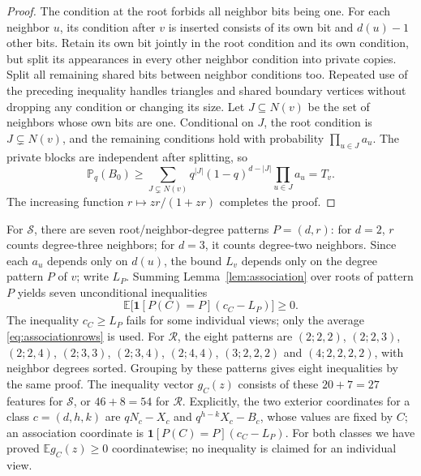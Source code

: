 \documentclass[11pt]{article}
\newcommand{\E}{\mathbb E}\newcommand{\Prob}{\mathbb P}
\newcommand{\ind}{\mathbf1}\newcommand{\F}{\mathcal F}\newcommand{\V}{\mathcal V}
\begin{document}
\begin{proof}
The condition at the root forbids all neighbor bits being one. For each neighbor $u$, its condition after $v$ is inserted consists of its own bit and $d(u)-1$ other bits. Retain its own bit jointly in the root condition and its own condition, but split its appearances in every other neighbor condition into private copies. Split all remaining shared bits between neighbor conditions too. Repeated use of the preceding inequality handles triangles and shared boundary vertices without dropping any condition or changing its size. Let $J\subseteq N(v)$ be the set of neighbors whose own bits are one. Conditional on $J$, the root condition is $J\subsetneq N(v)$, and the remaining conditions hold with probability $\prod_{u\in J}a_u$. The private blocks are independent after splitting, so
\[
 \Prob_q(B_0)\ge\sum_{J\subsetneq N(v)}q^{|J|}(1-q)^{d-|J|}
                \prod_{u\in J}a_u=T_v.
\]
The increasing function $r\mapsto zr/(1+zr)$ completes the proof.
\end{proof}
For $\mathcal S$, there are seven root/neighbor-degree patterns $P=(d,r)$: for $d=2$, $r$ counts degree-three neighbors; for $d=3$, it counts degree-two neighbors. Since each $a_u$ depends only on $d(u)$, the bound $L_v$ depends only on the degree pattern $P$ of $v$; write $L_P$. Summing Lemma~\ref{lem:association} over roots of pattern $P$ yields seven unconditional inequalities
\begin{equation}\label{eq:associationrows}
 \E\bigl[\ind[P(C)=P](c_C-L_P)\bigr]\ge0.
\end{equation}
The inequality $c_C\ge L_P$ fails for some individual views; only the average \eqref{eq:associationrows} is used. For $\mathcal R$, the eight patterns are $(2;2,2)$, $(2;2,3)$, $(2;2,4)$, $(2;3,3)$, $(2;3,4)$, $(2;4,4)$, $(3;2,2,2)$ and $(4;2,2,2,2)$, with neighbor degrees sorted. Grouping by these patterns gives eight inequalities by the same proof. The inequality vector $g_C(z)$ consists of these $20+7=27$ features for $\mathcal S$, or $46+8=54$ for $\mathcal R$. Explicitly, the two exterior coordinates for a class $c=(d,h,k)$ are $qN_c-X_c$ and $q^{h-k}X_c-B_c$, whose values are fixed by $C$; an association coordinate is $\ind[P(C)=P](c_C-L_P)$. For both classes we have proved $\E g_C(z)\ge0$ coordinatewise; no inequality is claimed for an individual view.
\end{document}
